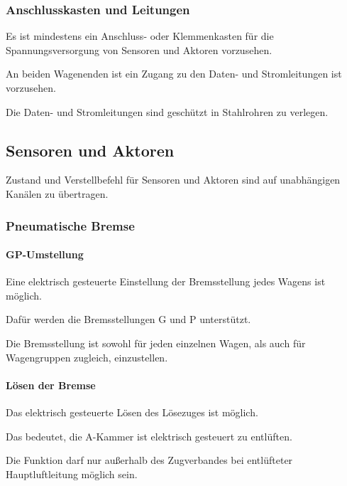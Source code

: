 \subsubsection{Anschlusskasten und Leitungen}
\begin{feat}
Es ist mindestens ein Anschluss- oder Klemmenkasten für die Spannungsversorgung von Sensoren und Aktoren vorzusehen. 
\end{feat}
\begin{feat}
An beiden Wagenenden ist ein Zugang zu den Daten- und Stromleitungen ist vorzusehen.
\end{feat}
\begin{feat}
Die Daten- und Stromleitungen sind geschützt in Stahlrohren zu verlegen.
\end{feat}

\subsection{Sensoren und Aktoren}
\begin{feat}
Zustand und Verstellbefehl für Sensoren und Aktoren sind auf unabhängigen Kanälen zu übertragen.
\end{feat}
\subsubsection{Pneumatische Bremse}
\paragraph{GP-Umstellung}
\begin{feat}
Eine elektrisch gesteuerte Einstellung der Bremsstellung jedes Wagens ist möglich.
\end{feat}
\begin{rem} [zu Anf. 17]
Dafür werden die Bremsstellungen G und P unterstützt.
\end{rem}
\begin{rem} [zu Anf. 17]
Die Bremsstellung ist sowohl für jeden einzelnen Wagen, als auch für Wagengruppen zugleich, einzustellen.
\end{rem}

\paragraph{Lösen der Bremse}
\begin{feat}
Das elektrisch gesteuerte Lösen des Lösezuges ist möglich.
\end{feat}
\begin{rem}[zu Anf. 18]
Das bedeutet, die A-Kammer ist elektrisch gesteuert zu entlüften.
\end{rem}
\begin{rem}[zu Anf. 18]
Die Funktion darf nur außerhalb des Zugverbandes bei entlüfteter Hauptluftleitung möglich sein.
\end{rem}

